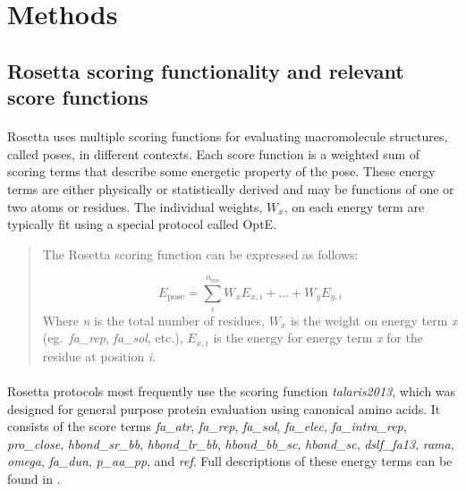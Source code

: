 \section{Methods}

\subsection{Rosetta scoring functionality and relevant score functions}
\paragraph{}
Rosetta uses multiple scoring functions for evaluating macromolecule structures, called poses, in different contexts. 
Each score function is a weighted sum of scoring terms that describe some energetic property of the pose.
These energy terms are either physically or statistically derived and may be functions of one or two atoms or residues.
The individual weights, $W_x$, on each energy term are typically fit using a special protocol called OptE\cite{leaver-fay_chapter_2013}.

\begin{quote} 
The Rosetta scoring function can be expressed as follows:

\begin{equation}
E_{\text{pose}} = \sum_{i}^{n_{\text{res}}} W_{x} E_{x,i} + ... + W_{y} E_{y,i}
\end{equation}
Where \textit{n} is the total number of residues, $W_{x}$ is the weight on energy term \textit{x} (eg.\ \textit{fa\_rep}, \textit{fa\_sol}, etc.), $E_{x,i}$ is the energy for energy term \textit{x} for the residue at position \textit{i}. 
\end{quote}

\paragraph{}
Rosetta protocols most frequently use the scoring function \textit{talaris2013}, which was designed for general purpose protein evaluation using canonical amino acids\cite{leaver-fay_chapter_2013}.
It consists of the score terms \textit{fa\_atr}, \textit{fa\_rep}, \textit{fa\_sol}, \textit{fa\_elec}, \textit{fa\_intra\_rep}, \textit{pro\_close}, \textit{hbond\_sr\_bb}, \textit{hbond\_lr\_bb}, \textit{hbond\_bb\_sc}, \textit{hbond\_sc}, \textit{dslf\_fa13}, \textit{rama}, \textit{omega}, \textit{fa\_dun}, \textit{p\_aa\_pp}, and \textit{ref}.
Full descriptions of these energy terms can be found in \cite{leaver-fay_chapter_2013}.

